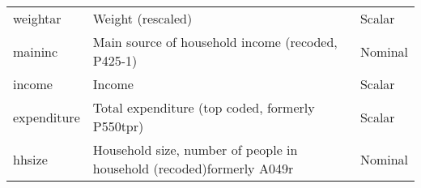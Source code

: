 \documentclass[]{article}
\begin{document}
\begin{longtable}[]{@{}lll@{}}
\begin{minipage}[t]{0.14\columnwidth}\raggedright
weightar\strut
\end{minipage} & \begin{minipage}[t]{0.64\columnwidth}\raggedright
Weight (rescaled)\strut
\end{minipage} & \begin{minipage}[t]{0.14\columnwidth}\raggedright
Scalar\strut
\end{minipage}\tabularnewline
\begin{minipage}[t]{0.14\columnwidth}\raggedright
maininc\strut
\end{minipage} & \begin{minipage}[t]{0.64\columnwidth}\raggedright
Main source of household income (recoded, P425-1)\strut
\end{minipage} & \begin{minipage}[t]{0.14\columnwidth}\raggedright
Nominal\strut
\end{minipage}\tabularnewline
\begin{minipage}[t]{0.14\columnwidth}\raggedright
income\strut
\end{minipage} & \begin{minipage}[t]{0.64\columnwidth}\raggedright
Income\strut
\end{minipage} & \begin{minipage}[t]{0.14\columnwidth}\raggedright
Scalar\strut
\end{minipage}\tabularnewline
\begin{minipage}[t]{0.14\columnwidth}\raggedright
expenditure\strut
\end{minipage} & \begin{minipage}[t]{0.64\columnwidth}\raggedright
Total expenditure (top coded, formerly P550tpr)\strut
\end{minipage} & \begin{minipage}[t]{0.14\columnwidth}\raggedright
Scalar\strut
\end{minipage}\tabularnewline
\begin{minipage}[t]{0.14\columnwidth}\raggedright
hhsize\strut
\end{minipage} & \begin{minipage}[t]{0.64\columnwidth}\raggedright
Household size, number of people in household (recoded)formerly
A049r\strut
\end{minipage} & \begin{minipage}[t]{0.14\columnwidth}\raggedright
Nominal\strut
\end{minipage}\tabularnewline
\bottomrule
\end{longtable}
\end{document}
